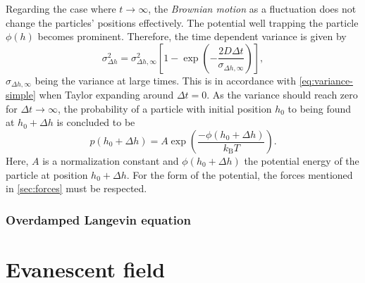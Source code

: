 \documentclass[.../bericht]{subfilies}
\begin{document}
           Regarding the case where $t\rightarrow \infty$, the \textit{Brownian motion} as a fluctuation does not change the particles' positions effectively. The potential well trapping the particle $\phi (h)$ becomes prominent. Therefore, the time dependent variance is given by
           \begin{equation*}
             \sigma_{\Delta h}^2=\sigma_{\Delta h, \infty}^2 \left[ 1-\exp\left( - \frac{2D\Delta t}{\sigma_{\Delta h, \infty}}\right)\right],
           \end{equation*}
           $\sigma_{\Delta h,\infty}$ being the variance at large times. This is in accordance with \cref{eq:variance-simple} when Taylor expanding around $\Delta t = 0$. As the variance should reach zero for $\Delta t \rightarrow \infty$, the probability of a particle with initial position $h_0$ to being found at $h_0 +\Delta h$ is concluded to be
           \begin{equation*}
              p(h_0+ \Delta h)=A\exp\left( \frac{-\phi (h_0+\Delta h)}{k_\mathrm{B}T}\right).
           \end{equation*}
           Here, $A$ is a normalization constant and $\phi ( h_0 + \Delta h)$ the potential energy of the particle at position $h_0 + \Delta h$. For the form of the potential, the forces mentioned in \cref{sec:forces} must be respected. \cite{walz}

           \subsubsection{Overdamped Langevin equation}




      \section{Evanescent field}
      \label{sec:evanenscent}
\end{document}
